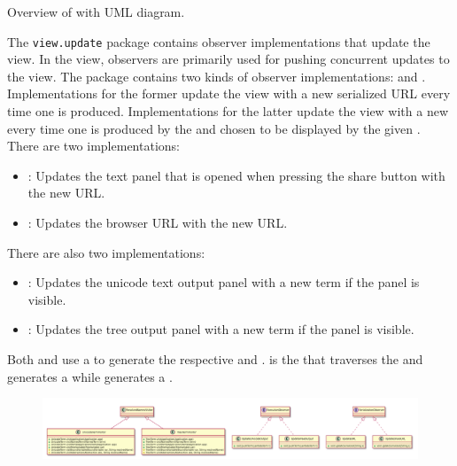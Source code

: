 Overview of \texttt{\pkg} with UML diagram.

The \texttt{view.update} package contains observer implementations that update the view. In the view, observers are primarily used for pushing concurrent updates to the view.
The package contains two kinds of observer implementations: \texttt{} and \texttt{}. 
Implementations for the former update the view with a new serialized URL every time one is produced. 
Implementations for the latter update the view with a new \texttt{} every time one is produced by the \texttt{} and chosen to be displayed by the given \texttt{}.
There are two \texttt{} implementations:
\begin{itemize}
	\item \texttt{}: Updates the text panel that is opened when pressing the share button with the new URL.
	\item \texttt{}: Updates the browser URL with the new URL.
\end{itemize}
There are also two \texttt{} implementations:
\begin{itemize}
	\item \texttt{}: Updates the unicode text output panel with a new term if the panel is visible.
	\item \texttt{}: Updates the tree output panel with a new term if the panel is visible.
\end{itemize}
Both \texttt{} and \texttt{} use a \texttt{} to generate the respective \texttt{} and \texttt{}.
\texttt{} is the \texttt{} that traverses the \texttt{} and generates a \texttt{} while \texttt{} generates a \texttt{}.

\begin{figure}[H]
	\centering
	\includegraphics[width=\textwidth]{packageDiagrams/updatePackage}
\end{figure}
